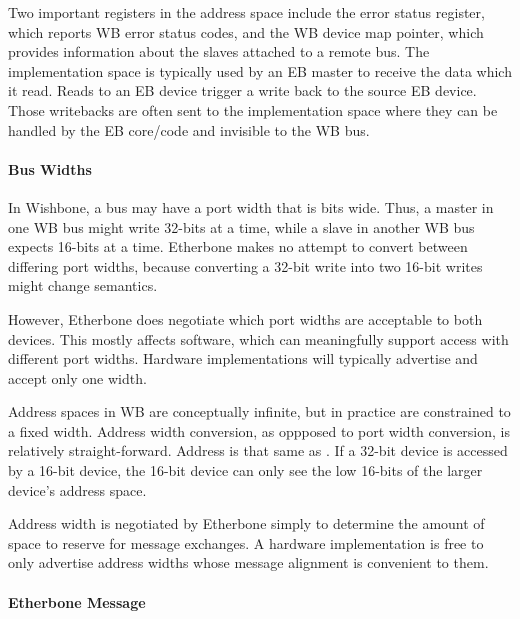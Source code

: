 \noindent Two important registers in the address space include the error status register, which reports WB error status codes, and the WB device map
pointer, which provides information about the slaves attached to a remote bus. 
The implementation space is typically used by an EB master to receive the data which it read. 
Reads to an EB device trigger a write back to the source EB device. 
Those writebacks are often sent to the implementation space where they can be handled by the EB core/code and invisible to the WB bus.

\paragraph{Bus Widths}

In Wishbone, a bus may have a port width that is  bits wide.
Thus, a master in one WB bus might write 32-bits at a time, while a slave in another WB bus expects 16-bits at a time. 
Etherbone makes no attempt to convert between differing port widths, because converting a 32-bit write into two 16-bit writes might change semantics.

\vspace{5 mm}

\noindent However, Etherbone does negotiate which port widths are acceptable to both devices. 
This mostly affects software, which can meaningfully support access with different port widths. 
Hardware implementations will typically advertise and accept only one width.

\vspace{5 mm}

\noindent Address spaces in WB are conceptually infinite, but in practice are constrained to a fixed width. 
Address width conversion, as oppposed to port width conversion, is relatively straight-forward. 
Address  is that same as . 
If a 32-bit device is accessed by a 16-bit device, the 16-bit device can only see the low 16-bits of the larger device's address space.

\vspace{5 mm}

\noindent Address width is negotiated by Etherbone simply to determine the amount of space to reserve for message exchanges. 
A hardware implementation is free to only advertise address widths whose message alignment is convenient to them.

\paragraph{Etherbone Message}

